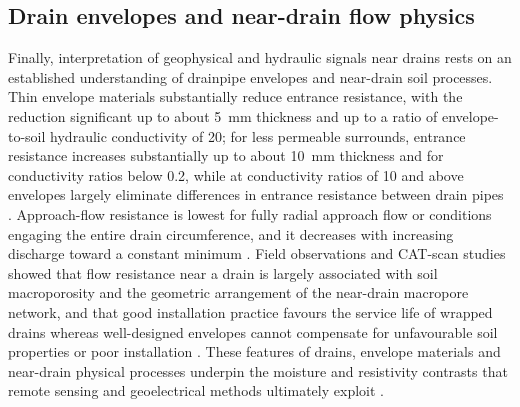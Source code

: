 \documentclass[11pt]{article}
\begin{document}
\subsection{Drain envelopes and near-drain flow physics}

Finally, interpretation of geophysical and hydraulic signals near drains rests on an established understanding of drainpipe envelopes and near-drain soil processes. Thin envelope materials substantially reduce entrance resistance, with the reduction significant up to about 5~mm thickness and up to a ratio of envelope-to-soil hydraulic conductivity of 20; for less permeable surrounds, entrance resistance increases substantially up to about 10~mm thickness and for conductivity ratios below 0.2, while at conductivity ratios of 10 and above envelopes largely eliminate differences in entrance resistance between drain pipes \parencite{Stuyt2006}. Approach-flow resistance is lowest for fully radial approach flow or conditions engaging the entire drain circumference, and it decreases with increasing discharge toward a constant minimum \parencite{Stuyt2006}. Field observations and CAT-scan studies showed that flow resistance near a drain is largely associated with soil macroporosity and the geometric arrangement of the near-drain macropore network, and that good installation practice favours the service life of wrapped drains whereas well-designed envelopes cannot compensate for unfavourable soil properties or poor installation \parencite{Stuyt2006}. These features of drains, envelope materials and near-drain physical processes underpin the moisture and resistivity contrasts that remote sensing and geoelectrical methods ultimately exploit \parencite{Stuyt2006}.

\printbibliography
\end{document}
